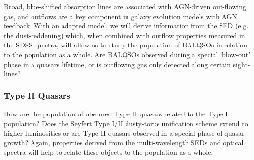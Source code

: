 Broad, blue-shifted absorption lines are associated with AGN-driven out-flowing gas, and outflows are a key component in galaxy evolution models with AGN feedback. With an adapted model, we will derive information from the SED (e.g. the dust-reddening) which, when combined with outflow properties measured in the SDSS spectra, will allow us to study the population of BALQSOs in relation to the population as a whole. Are BALQSOs observed during a special `blow-out' phase in a quasars lifetime, or is outflowing gas only detected along certain sight-lines? 

\subsubsection{Type II Quasars}

How are the population of obscured Type II quasars related to the Type I population? Does the Seyfert Type I/II dusty-torus unification scheme extend to higher luminosities or are Type II quasars observed in a special phase of quasar growth? Again, properties derived from the multi-wavelength SEDs and optical spectra will help to relate these objects to the population as a whole. 




